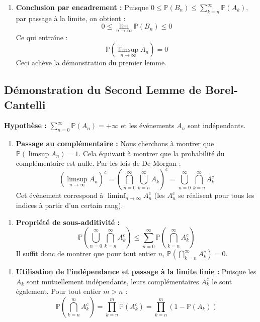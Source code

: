 \documentclass[11pt,a4paper]{article}
\begin{document}
\begin{enumerate}
\item \textbf{Conclusion par encadrement :}
   Puisque $0 \le \mathbb{P}(B_n) \le \sum_{k=n}^\infty \mathbb{P}(A_k)$, par passage à la limite, on obtient :
   $$ 0 \le \lim_{n \to \infty} \mathbb{P}(B_n) \le 0 $$
   Ce qui entraîne :
   $$ \mathbb{P}\left(\limsup_{n \to \infty} A_n\right) = 0 $$
   Ceci achève la démonstration du premier lemme.
\end{enumerate}


\subsection{Démonstration du Second Lemme de Borel-Cantelli}

\textbf{Hypothèse :} $\sum_{n=0}^\infty \mathbb{P}(A_n) = +\infty$ et les événements $A_n$ sont indépendants.

\begin{enumerate}
\item \textbf{Passage au complémentaire :}
   Nous cherchons à montrer que $\mathbb{P}(\limsup A_n) = 1$. Cela équivaut à montrer que la probabilité du complémentaire est nulle.
   Par les lois de De Morgan :
   $$ \left( \limsup_{n \to \infty} A_n \right)^c = \left( \bigcap_{n=0}^\infty \bigcup_{k=n}^\infty A_k \right)^c = \bigcup_{n=0}^\infty \bigcap_{k=n}^\infty A_k^c $$
   Cet événement correspond à $\liminf_{n \to \infty} A_n^c$ (les $A_n^c$ se réalisent pour tous les indices à partir d'un certain rang).
\end{enumerate}

\begin{enumerate}
\item \textbf{Propriété de sous-additivité :}
   $$ \mathbb{P}\left( \bigcup_{n=0}^\infty \bigcap_{k=n}^\infty A_k^c \right) \le \sum_{n=0}^\infty \mathbb{P}\left( \bigcap_{k=n}^\infty A_k^c \right) $$
   Il suffit donc de montrer que pour tout entier $n$, $\mathbb{P}\left( \bigcap_{k=n}^\infty A_k^c \right) = 0$.
\end{enumerate}

\begin{enumerate}
\item \textbf{Utilisation de l'indépendance et passage à la limite finie :}
   Puisque les $A_k$ sont mutuellement indépendants, leurs complémentaires $A_k^c$ le sont également.
   Pour tout entier $m > n$ :
   $$ \mathbb{P}\left( \bigcap_{k=n}^m A_k^c \right) = \prod_{k=n}^m \mathbb{P}(A_k^c) = \prod_{k=n}^m (1 - \mathbb{P}(A_k)) $$
\end{enumerate}
\end{document}
